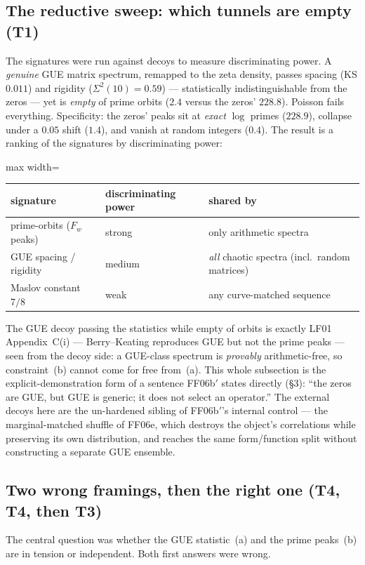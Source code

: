\documentclass[11pt,a4paper]{article}
\newcommand{\TT}{\textsf{T1}}
\newcommand{\Th}{\textsf{T3}}
\newcommand{\Tf}{\textsf{T4}}
\theoremstyle{definition}
\theoremstyle{plain}
\begin{document}
\subsection{The reductive sweep: which tunnels are empty (\TT)}
The signatures were run against decoys to measure discriminating power. A \emph{genuine} GUE matrix
spectrum, remapped to the zeta density, passes spacing (KS $0.011$) and rigidity ($\Sigma^2(10)=0.59$)
--- statistically indistinguishable from the zeros --- yet is \emph{empty} of prime orbits
($2.4$ versus the zeros' $228.8$). Poisson fails everything. Specificity: the zeros' peaks sit at
\emph{exact} $\log$ primes ($228.9$), collapse under a $0.05$ shift ($1.4$), and vanish at random
integers ($0.4$). The result is a ranking of the signatures by discriminating power:

\begin{center}
\small
\begin{adjustbox}{max width=\linewidth}\begin{tabular}{lll}
\toprule
\textbf{signature} & \textbf{discriminating power} & \textbf{shared by} \\
\midrule
prime-orbits ($F_w$ peaks) & strong & only arithmetic spectra \\
GUE spacing / rigidity & medium & \emph{all} chaotic spectra (incl.\ random matrices) \\
Maslov constant $7/8$ & weak & any curve-matched sequence \\
\bottomrule
\end{tabular}\end{adjustbox}
\end{center}

\noindent The GUE decoy passing the statistics while empty of orbits is exactly \textsf{LF01}
Appendix~C(i) --- Berry--Keating reproduces GUE but not the prime peaks --- seen from the decoy
side: a GUE-class spectrum is \emph{provably} arithmetic-free, so constraint~(b) cannot come for
free from~(a). This whole subsection is the explicit-demonstration form of a sentence
\textsf{FF06b$'$} states directly (\S3): ``the zeros are GUE, but GUE is generic; it does not select
an operator.'' The external decoys here are the un-hardened sibling of \textsf{FF06b$'$}'s internal
control --- the marginal-matched shuffle of \textsf{FF06e}, which destroys the object's correlations
while preserving its own distribution, and reaches the same form/function split without constructing
a separate GUE ensemble.

\subsection{Two wrong framings, then the right one (\Tf, \Tf, then \Th)}
The central question was whether the GUE statistic~(a) and the prime peaks~(b) are in tension or
independent. Both first answers were wrong.
\end{document}
